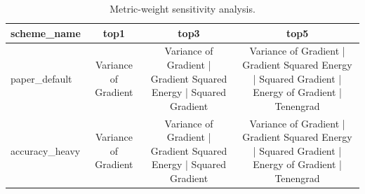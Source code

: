 \begin{table}[t]
\centering
\caption{Metric-weight sensitivity analysis.}
\begin{tabular}{lccc}
\hline
scheme_name & top1 & top3 & top5 \\
\hline
paper\_default & Variance of Gradient & Variance of Gradient | Gradient Squared Energy | Squared Gradient & Variance of Gradient | Gradient Squared Energy | Squared Gradient | Energy of Gradient | Tenengrad \\
accuracy\_heavy & Variance of Gradient & Variance of Gradient | Gradient Squared Energy | Squared Gradient & Variance of Gradient | Gradient Squared Energy | Squared Gradient | Energy of Gradient | Tenengrad \\
\hline
\end{tabular}
\end{table}